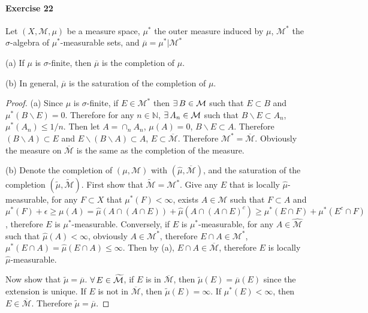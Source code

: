 \paragraph{Exercise 22}
Let $(X,\mathcal{M},\mu)$ be a measure space, $\mu^*$ the outer measure induced by $\mu$, $\mathcal{M}^*$ the $\sigma$-algebra of $\mu^*$-measurable sets, and $\overline{\mu}=\mu^*|\mathcal{M}^*$
\par (a) If $\mu$ is $\sigma$-finite, then $\overline{\mu}$ is the completion of $\mu$.
\par (b) In general, $\overline{\mu}$ is the saturation of the completion of $\mu$.
\begin{proof}
    (a) Since $\mu$ is $\sigma$-finite, if $E\in\mathcal{M}^*$ then $\exists\, B\in\mathcal{M}$ such that $E\subset B$ and $\mu^*(B\backslash E)=0$. Therefore for any $n\in\mathbb{N}$, $\exists\, A_n\in\mathcal{M}$ such that $B\backslash E\subset A_n$, $\mu^*(A_n)\le1/n$. Then let $A=\cap_n A_n$, $\mu(A)=0$, $B\backslash E\subset A$. Therefore $(B\backslash A)\subset E$ and $E\backslash(B\backslash A)\subset A$, $E\subset\overline{\mathcal{M}}$. Therefore $\mathcal{M}^*=\overline{\mathcal{M}}$. Obviously the measure on $\overline{\mathcal{M}}$ is the same as the completion of the measure.
    \par (b) Denote the completion of $(\mu,\mathcal{M})$ with $(\hat{\mu},\overline{\mathcal{M}})$, and the saturation of the completion $(\widetilde{\mu},\widetilde{\mathcal{M}})$. First show that $\widetilde{\mathcal{M}}=\mathcal{M}^*$. Give any $E$ that is locally $\hat{\mu}$-measurable, for any $F\subset X$ that $\mu^*(F)<\infty$, exists $A\in\mathcal{M}$ such that $F\subset A$ and $\mu^*(F)+\epsilon\ge\mu(A)=\hat\mu(A\cap(A\cap E))+\hat\mu(A\cap(A\cap E)^c)\ge\mu^*(E\cap F)+\mu^*(E^c\cap F)$, therefore $E$ is $\mu^*$-measurable. Conversely, if $E$ is $\mu^*$-measurable, for any $A\in\hat{\mathcal{M}}$ such that $\hat\mu(A)<\infty$, obviously $A\in\mathcal{M}^*$, therefore $E\cap A\in\mathcal{M}^*$, $\mu^*(E\cap A)=\hat\mu(E\cap A)\le\infty$. Then by (a), $E\cap A\in\overline{\mathcal{M}}$, therefore $E$ is locally $\hat\mu$-measurable.
    \par Now show that $\widetilde{\mu}=\overline{\mu}$. $\forall\, E\in\widetilde{\mathcal{M}}$, if $E$ is in $\overline{\mathcal{M}}$, then $\widetilde{\mu}(E)=\overline{\mu}(E)$ since the extension is unique. If $E$ is not in $\overline{\mathcal{M}}$, then $\widetilde{\mu}(E)=\infty$. If $\mu^*(E)<\infty$, then $E\in\overline{\mathcal{M}}$. Therefore $\widetilde{\mu}=\overline{\mu}$.
\end{proof}
